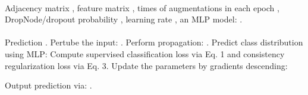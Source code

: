  \begin{algorithm}[t]
\caption{\model}
\small
\label{alg:2}
\begin{algorithmic}[1] \REQUIRE ~~\\
 Adjacency matrix ,
feature matrix , 
times of augmentations in each epoch , DropNode/dropout probability , learning rate , an MLP model: .\\
\ENSURE ~~\\
Prediction . 
\FOR{} 
\STATE Pertube the input:  . 
\STATE Perform propagation: .
\STATE Predict class distribution using MLP: 
\ENDFOR
\STATE Compute supervised classification loss  via Eq. 1 and consistency regularization loss via Eq. 3.
\STATE Update the parameters  by gradients descending:

\ENDWHILE
\STATE Output prediction  via: .

\end{algorithmic}
\end{algorithm}


















































































